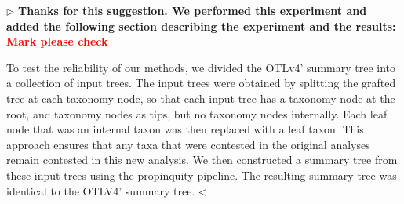 \documentclass{article}
\newenvironment{reply}{$\triangleright$\bf}{$\triangleleft$}
\renewenvironment{quote}
               {\list{}{\rightmargin\leftmargin}%
                \item\relax\normalfont}
               {\endlist}
\begin{document}
\begin{reply}
Thanks for this suggestion.  We performed this experiment and added the following section describing the experiment and the results: \textcolor{red}{\textbf{Mark please check}}
\begin{quote}
To test the reliability of our methods, we divided the OTLv4' summary
tree into a collection of input trees. The input trees were obtained
by splitting the grafted tree at each taxonomy node, so that each
input tree has a taxonomy node at the root, and taxonomy nodes as
tips, but no taxonomy nodes internally.  Each leaf node that was an
internal taxon was then replaced with a leaf taxon. This approach
ensures that any taxa that were contested in the original analyses
remain contested in this new analysis.  We then constructed a summary
tree from these input trees using the propinquity pipeline.  The
resulting summary tree was identical to the OTLV4' summary tree.  
\end{quote}
\end{reply}



\end{document}
